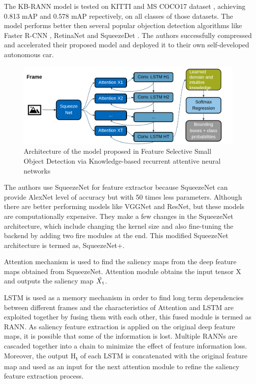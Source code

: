\documentclass[conference]{IEEEtran}
\begin{document}
The KB-RANN model is tested on KITTI and MS COCO17 dataset \cite{b31}, achieving 0.813 mAP and 0.578 mAP repectively, on all classes of those datasets. The model performs better then several popular objection detection algorithms like Faster R-CNN \cite{b15}, RetinaNet \cite{b32} and SqueezeDet \cite{b33}.
The authors successfully compressed and accelerated their proposed model and deployed it to their own self-developed autonomous car. \newline

\begin{figure}[h]
\includegraphics[width=\columnwidth]{KB-RANN-architecture}
\caption{Architecture of the model proposed in Feature Selective Small Object Detection via Knowledge-based recurrent attentive neural networks}
\end{figure}

The authors use SqueezeNet\cite{b34} for feature extractor because SqueezeNet can provide AlexNet\cite{b14} level of accuracy but with 50 times less parameters. Although there are better performing models like VGGNet\cite{b45} and ResNet\cite{b40}, but these models are computationally expensive. They make a few changes in the SqueezeNet architecture, which include changing the kernel size and also fine-tuning the backend by adding two fire modules at the end. This modified SqueezeNet architecture is termed as, SqueezeNet+. \newline

Attention mechanism is used to find the saliency maps from the deep feature maps obtained from SqueezeNet. Attention module obtains the input tensor X and outputs the saliency map $\tilde{X\textsubscript{t}}$. \newline

LSTM \cite{b18} is used as a memory mechanism in order to find long term dependencies between different frames and the characteristics of Attention and LSTM are exploited together by fusing them with each other, this fused module is termed as RANN. As saliency feature extraction is applied on the original deep feature maps, it is possible that some of the information is lost. Multiple RANNs are cascaded together into a chain to minimize the effect of feature information loss. Moreover, the output H\textsubscript{t} of each LSTM is concatenated with the original feature map and used as an input for the next attention module to refine the saliency feature extraction process. \newline
\end{document}
